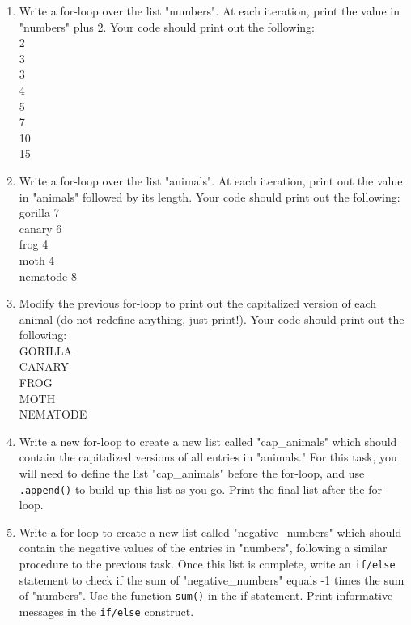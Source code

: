 \documentclass{article}[12pt]
\newcommand{\code}[1]{\texttt{#1}}  %
\begin{document}
\begin{enumerate}

    \item Write a for-loop over the list "numbers". At each iteration, print the value in "numbers" plus 2. Your code should print out the following:\\
        2 \\ 
        3 \\
        3 \\
        4 \\
        5 \\
        7 \\
        10 \\
        15 \\
    \item Write a for-loop over the list "animals". At each iteration, print out the value in "animals" followed by its length. Your code should print out the following:\\
        gorilla 7 \\
        canary 6  \\
        frog 4    \\
        moth 4     \\
        nematode 8  \\
    \item Modify the previous for-loop to print out the capitalized version of each animal (do not redefine anything, just print!). Your code should print out the following:\\
        GORILLA \\
        CANARY  \\
        FROG    \\
        MOTH     \\
        NEMATODE  \\
    \item Write a new for-loop to create a new list called "cap\_animals" which should contain the capitalized versions of all entries in "animals." For this task, you will need to define the list "cap\_animals" before the for-loop, and use \code{.append()} to build up this list as you go. Print the final list after the for-loop.
    
    \item Write a for-loop to create a new list called "negative\_numbers" which should contain the negative values of the entries in "numbers", following a similar procedure to the previous task. Once this list is complete, write an \code{if/else} statement to check if the sum of "negative\_numbers" equals -1 times the sum of "numbers". Use the function \code{sum()} in the if statement. Print informative messages in the \code{if/else} construct.
	

\end{enumerate}
\end{document}
